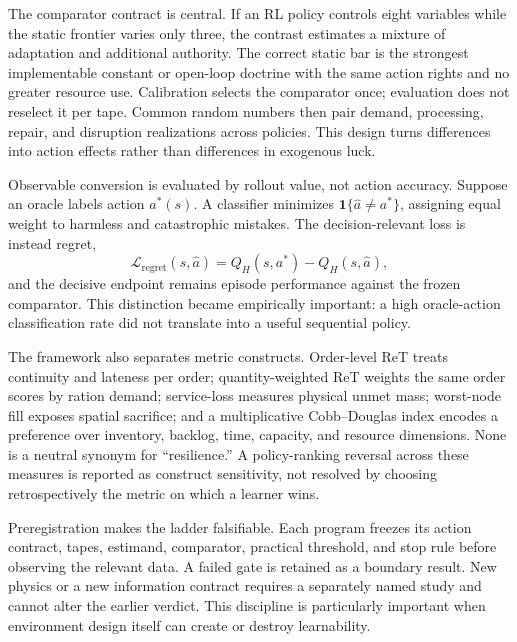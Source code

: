 The comparator contract is central. If an RL policy controls eight variables while the static
frontier varies only three, the contrast estimates a mixture of adaptation and additional
authority. The correct static bar is the strongest implementable constant or open-loop doctrine
with the same action rights and no greater resource use. Calibration selects the comparator
once; evaluation does not reselect it per tape. Common random numbers then pair demand,
processing, repair, and disruption realizations across policies. This design turns differences
into action effects rather than differences in exogenous luck.

Observable conversion is evaluated by rollout value, not action accuracy. Suppose an oracle
labels action $a^*(s)$. A classifier minimizes $\mathbf{1}\{\hat a\ne a^*\}$, assigning equal
weight to harmless and catastrophic mistakes. The decision-relevant loss is instead regret,
\begin{equation}
\mathcal{L}_{\mathrm{regret}}(s,\hat a)=Q_H(s,a^*)-Q_H(s,\hat a),
\end{equation}
and the decisive endpoint remains episode performance against the frozen comparator. This
distinction became empirically important: a high oracle-action classification rate did not
translate into a useful sequential policy.

The framework also separates metric constructs. Order-level ReT treats continuity and lateness
per order; quantity-weighted ReT weights the same order scores by ration demand; service-loss
measures physical unmet mass; worst-node fill exposes spatial sacrifice; and a multiplicative
Cobb--Douglas index encodes a preference over inventory, backlog, time, capacity, and resource
dimensions. None is a neutral synonym for ``resilience.'' A policy-ranking reversal across
these measures is reported as construct sensitivity, not resolved by choosing retrospectively
the metric on which a learner wins.

Preregistration makes the ladder falsifiable. Each program freezes its action contract, tapes,
estimand, comparator, practical threshold, and stop rule before observing the relevant data.
A failed gate is retained as a boundary result. New physics or a new information contract
requires a separately named study and cannot alter the earlier verdict. This discipline is
particularly important when environment design itself can create or destroy learnability.

